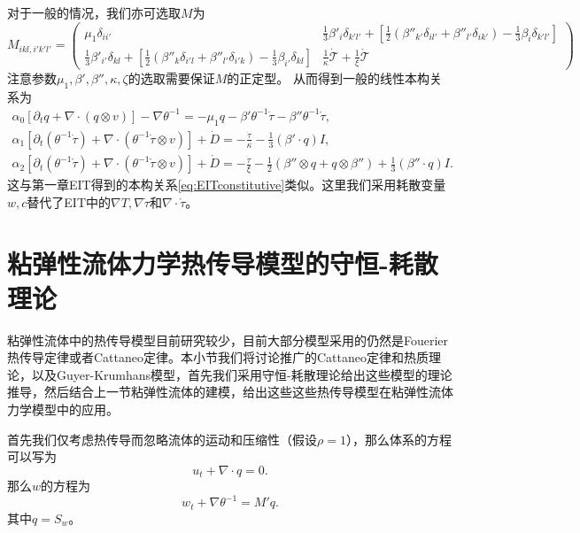 \documentclass{article}
\begin{document}
	对于一般的情况，我们亦可选取$M$为
	\begin{equation*}
		M_{ikl,i'k'l'} = \left( \begin{array}{ccc} 
			\mu_1 \delta_{ii' } & \frac{1}{3}\beta'_i \delta_{k'l'} +  [\frac{1}{2} (\beta''_{k'} \delta_{il'} + \beta''_{l'} \delta_{ik'}) - \frac{1}{3} \beta_{i} \delta_{k'l'}]\\
			\frac{1}{3}\beta'_{i'} \delta_{kl} +  [\frac{1}{2} (\beta''_{k} \delta_{i'l} + \beta''_{l'} \delta_{i'k}) - \frac{1}{3} \beta_{i'} \delta_{kl}] &  \frac{1}{\kappa} \dot{\mathcal{T}} + \frac{1}{\xi} \mathring{\mathcal{T}}  
		\end{array} \right)
	\end{equation*} 
	注意参数$\mu_1,\beta',\beta'',\kappa,\zeta$的选取需要保证$M$的正定型。
	从而得到一般的线性本构关系为
	\begin{subequations}
		\begin{align*}
			\alpha_0 [\partial_t q +  \nabla \cdot (q \otimes v)] - \nabla \theta^{-1} = - \mu_1 q -\beta' \theta^{-1} \dot{\tau} - \beta'' \theta^{-1} \mathring{\tau} , \\
			\alpha_1[\partial_t (\theta^{-1} \dot{\tau}) + \nabla \cdot (\theta^{-1} \dot{\tau} \otimes v)] + \dot{D} = -\frac{\dot{\tau}}{\kappa} - \frac{1}{3}(\beta' \cdot q) I, \\
			\alpha_2[\partial_t (\theta^{-1} \mathring{\tau}) + \nabla \cdot (\theta^{-1} \mathring{\tau} \otimes v)] + \mathring{D} = -\frac{\dot{\tau}}{\xi} - \frac{1}{2} (\beta''  \otimes q + q \otimes \beta'') + \frac{1}{3}(\beta'' \cdot q) I. 
		\end{align*}
	\end{subequations}
	这与第一章EIT得到的本构关系\eqref{eq:EITconstitutive}类似。这里我们采用耗散变量$w,c$替代了EIT中的$\nabla T, \nabla \dot{\tau}$和$\nabla \cdot{\mathring{\tau}}$。

	\section{粘弹性流体力学热传导模型的守恒-耗散理论}
	粘弹性流体中的热传导模型目前研究较少，目前大部分模型采用的仍然是Fouerier热传导定律或者Cattaneo定律。本小节我们将讨论推广的Cattaneo定律和热质理论，以及Guyer-Krumhans模型，首先我们采用守恒-耗散理论给出这些模型的理论推导，然后结合上一节粘弹性流体的建模，给出这些这些热传导模型在粘弹性流体力学模型中的应用。

首先我们仅考虑热传导而忽略流体的运动和压缩性（假设$\rho = 1$），那么体系的方程可以写为
\begin{equation*}
	 u_t  + \nabla \cdot q = 0 .	
\end{equation*}
那么$w$的方程为
\begin{equation*}
	 w_t + \nabla \theta^{-1} = M' q. 
\end{equation*}
其中$q = S_w$。
\end{document}
